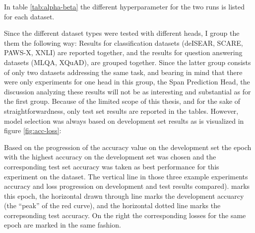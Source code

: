 In table \ref{tab:alpha-beta}
the different hyperparameter for the two runs is listed for each dataset.


Since the different dataset types were tested with different heads, I group the them the following
way: Results for classification datasets (deISEAR, SCARE, PAWS-X, XNLI) are reported together, and
the results for question answering datasets (MLQA, XQuAD), are grouped together. Since the latter
group consists of only two datasets addressing the same task, and bearing in mind that there were
only experiments for one head in this group, the Span Prediction Head, the discussion analyzing
these results will not be as interesting and substantial as for the first group. Because of the
limited scope of this thesis, and for the sake of straightforwardness, only test set results are
reported in the tables. However, model selection was always based on development set results as is
visualized in figure \ref{fig:acc-loss}:

Based on the progression of the accuracy value on the development set the epoch with
the highest accuracy on the development set was chosen and the corresponding test set
accuracy was taken as best performance for this experiment on the dataset. The vertical
line in those three example experiments accuracy and loss progression on development and
test results compared). marks this epoch, the horizontal drawn through line marks the
development accuarcy (the ``peak'' of the red curve), and the horizontal dotted line
marks the correpsonding test accuracy. On the right the corresponding losses for the
same epoch are marked in the same fashion.

